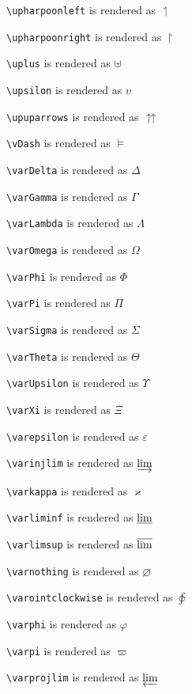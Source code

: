\texttt{\textbackslash upharpoonleft} is rendered as $\upharpoonleft$

\texttt{\textbackslash upharpoonright} is rendered as $\upharpoonright$

\texttt{\textbackslash uplus} is rendered as $\uplus$

\texttt{\textbackslash upsilon} is rendered as $\upsilon$

\texttt{\textbackslash upuparrows} is rendered as $\upuparrows$

\texttt{\textbackslash vDash} is rendered as $\vDash$

\texttt{\textbackslash varDelta} is rendered as $\varDelta$

\texttt{\textbackslash varGamma} is rendered as $\varGamma$

\texttt{\textbackslash varLambda} is rendered as $\varLambda$

\texttt{\textbackslash varOmega} is rendered as $\varOmega$

\texttt{\textbackslash varPhi} is rendered as $\varPhi$

\texttt{\textbackslash varPi} is rendered as $\varPi$

\texttt{\textbackslash varSigma} is rendered as $\varSigma$

\texttt{\textbackslash varTheta} is rendered as $\varTheta$

\texttt{\textbackslash varUpsilon} is rendered as $\varUpsilon$

\texttt{\textbackslash varXi} is rendered as $\varXi$

\texttt{\textbackslash varepsilon} is rendered as $\varepsilon$

\texttt{\textbackslash varinjlim} is rendered as $\varinjlim$

\texttt{\textbackslash varkappa} is rendered as $\varkappa$

\texttt{\textbackslash varliminf} is rendered as $\varliminf$

\texttt{\textbackslash varlimsup} is rendered as $\varlimsup$

\texttt{\textbackslash varnothing} is rendered as $\varnothing$

\texttt{\textbackslash varointclockwise} is rendered as $\varointclockwise$

\texttt{\textbackslash varphi} is rendered as $\varphi$

\texttt{\textbackslash varpi} is rendered as $\varpi$

\texttt{\textbackslash varprojlim} is rendered as $\varprojlim$

